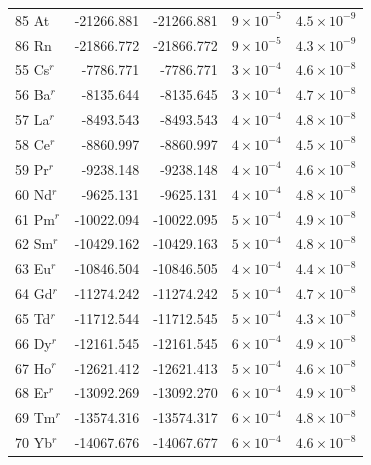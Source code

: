 \begin{longtable}{l r r r r}
85 At       &   -21266.881        & -21266.881        &   $9\times10^{-5}$      &   $4.5\times10^{-9}$    \\
86 Rn       &   -21866.772        & -21866.772        &   $9\times10^{-5}$      &   $4.3\times10^{-9}$    \\
55 Cs$^{r}$ &    -7786.771        &  -7786.771        &   $3\times10^{-4}$      &   $4.6\times10^{-8}$    \\
56 Ba$^{r}$ &    -8135.644        &  -8135.645        &   $3\times10^{-4}$      &   $4.7\times10^{-8}$    \\
57 La$^{r}$ &    -8493.543        &  -8493.543        &   $4\times10^{-4}$      &   $4.8\times10^{-8}$    \\
58 Ce$^{r}$ &    -8860.997        &  -8860.997        &   $4\times10^{-4}$      &   $4.5\times10^{-8}$    \\
59 Pr$^{r}$ &    -9238.148        &  -9238.148        &   $4\times10^{-4}$      &   $4.6\times10^{-8}$    \\
60 Nd$^{r}$ &    -9625.131        &  -9625.131        &   $4\times10^{-4}$      &   $4.8\times10^{-8}$    \\
61 Pm$^{r}$ &   -10022.094        & -10022.095        &   $5\times10^{-4}$      &   $4.9\times10^{-8}$    \\
62 Sm$^{r}$ &   -10429.162        & -10429.163        &   $5\times10^{-4}$      &   $4.8\times10^{-8}$    \\
63 Eu$^{r}$ &   -10846.504        & -10846.505        &   $4\times10^{-4}$      &   $4.4\times10^{-8}$    \\
64 Gd$^{r}$ &   -11274.242        & -11274.242        &   $5\times10^{-4}$      &   $4.7\times10^{-8}$    \\
65 Td$^{r}$ &   -11712.544        & -11712.545        &   $5\times10^{-4}$      &   $4.3\times10^{-8}$    \\
66 Dy$^{r}$ &   -12161.545        & -12161.545        &   $6\times10^{-4}$      &   $4.9\times10^{-8}$    \\
67 Ho$^{r}$ &   -12621.412        & -12621.413        &   $5\times10^{-4}$      &   $4.6\times10^{-8}$    \\
68 Er$^{r}$ &   -13092.269        & -13092.270        &   $6\times10^{-4}$      &   $4.9\times10^{-8}$    \\
69 Tm$^{r}$ &   -13574.316        & -13574.317        &   $6\times10^{-4}$      &   $4.8\times10^{-8}$    \\
70 Yb$^{r}$ &   -14067.676        & -14067.677        &   $6\times10^{-4}$      &   $4.6\times10^{-8}$    \\

\end{longtable}
